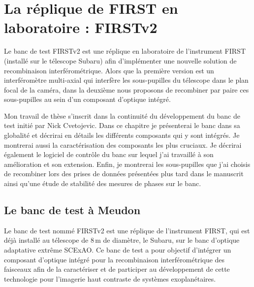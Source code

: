 \newpage\thispagestyle{empty}
\chapter{La réplique de FIRST en laboratoire : FIRSTv2}
\label{sec:FIRSTv2Concept}
\setcounter{figure}{0}
\setcounter{table}{0}

\begingroup
\hypersetup{linkcolor=black}
\minitoc
\endgroup

\clearpage
Le banc de test \ac{FIRSTv2} est une réplique en laboratoire de l'instrument \ac{FIRST} (installé sur le télescope Subaru) afin d'implémenter une nouvelle solution de recombinaison interférométrique. Alors que la première version est un interféromètre multi-axial qui interfère les sous-pupilles du télescope dans le plan focal de la caméra, dans la deuxième nous proposons de recombiner par paire ces sous-pupilles au sein d'un composant d'optique intégré.

Mon travail de thèse s'inscrit dans la continuité du développement du banc de test initié par Nick Cvetojevic. Dans ce chapitre je présenterai le banc dans sa globalité et décrirai en détails les différents composants qui y sont intégrés. Je montrerai aussi la caractérisation des composants les plus cruciaux. Je décrirai également le logiciel de contrôle du banc sur lequel j'ai travaillé à son amélioration et son extension. Enfin, je montrerai les sous-pupilles que j'ai choisis de recombiner lors des prises de données présentées plus tard dans le manuscrit ainsi qu'une étude de stabilité des mesures de phases sur le banc.


\section{Le banc de test à Meudon}

Le banc de test nommé \ac{FIRSTv2} est une réplique de l'instrument \ac{FIRST}, qui est déjà installé au télescope de $8 \,$m de diamètre, le Subaru, sur le banc d'optique adaptative extrême \ac{SCExAO}. Ce banc de test a pour objectif d'intégrer un composant d'optique intégré pour la recombinaison interférométrique des faisceaux afin de la caractériser et de participer au développement de cette technologie pour l'imagerie haut contraste de systèmes exoplanétaires.

